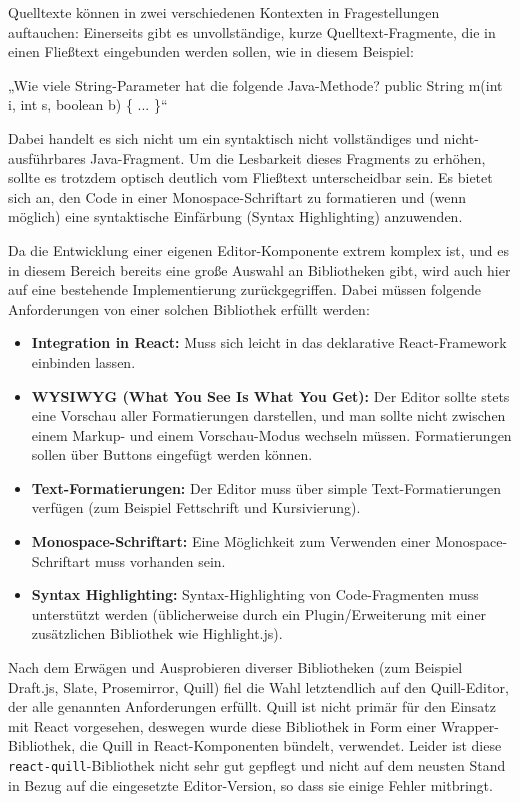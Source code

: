 Quelltexte können in zwei verschiedenen Kontexten in Fragestellungen auftauchen: Einerseits gibt es unvollständige, kurze Quelltext-Fragmente, die in einen Fließtext eingebunden werden sollen, wie in diesem Beispiel:

\begin{center}
„Wie viele String-Parameter hat die folgende Java-Methode?\newline
public String m(int i, int s, boolean b) \{ ... \}“
\end{center}

Dabei handelt es sich nicht um ein syntaktisch nicht vollständiges und nicht-ausführbares Java-Fragment. Um die Lesbarkeit dieses Fragments zu erhöhen, sollte es trotzdem optisch deutlich vom Fließtext unterscheidbar sein. Es bietet sich an, den Code in einer Monospace-Schriftart zu formatieren und (wenn möglich) eine syntaktische Einfärbung (Syntax Highlighting) anzuwenden.

Da die Entwicklung einer eigenen Editor-Komponente extrem komplex ist, und es in diesem Bereich bereits eine große Auswahl an Bibliotheken gibt, wird auch hier auf eine bestehende Implementierung zurückgegriffen. Dabei müssen folgende Anforderungen von einer solchen Bibliothek erfüllt werden:

\begin{itemize}
    \item \textbf{Integration in React:}  Muss sich leicht in das deklarative React-Framework einbinden lassen.
    \item \textbf{WYSIWYG (What You See Is What You Get):} Der Editor sollte stets eine Vorschau aller Formatierungen darstellen, und man sollte nicht zwischen einem Markup- und einem Vorschau-Modus wechseln müssen. Formatierungen sollen über Buttons eingefügt werden können.
    \item \textbf{Text-Formatierungen:} Der Editor muss über simple Text-Formatierungen verfügen (zum Beispiel Fettschrift und Kursivierung).
    \item \textbf{Monospace-Schriftart:} Eine Möglichkeit zum Verwenden einer Monospace-Schriftart muss vorhanden sein.
    \item \textbf{Syntax Highlighting:} Syntax-Highlighting von Code-Fragmenten muss unterstützt werden (üblicherweise durch ein Plugin/Erweiterung mit einer zusätzlichen Bibliothek wie Highlight.js).
\end{itemize}

Nach dem Erwägen und Ausprobieren diverser Bibliotheken (zum Beispiel Draft.js, Slate, Prosemirror, Quill) fiel die Wahl letztendlich auf den Quill-Editor\cite{web:quill}, der alle genannten Anforderungen erfüllt. Quill ist nicht primär für den Einsatz mit React vorgesehen, deswegen wurde diese Bibliothek in Form einer Wrapper-Bibliothek, die Quill in React-Komponenten bündelt, verwendet. Leider ist diese \texttt{react-quill}-Bibliothek\cite{web:react_quill} nicht sehr gut gepflegt und nicht auf dem neusten Stand in Bezug auf die eingesetzte Editor-Version, so dass sie einige Fehler mitbringt.

